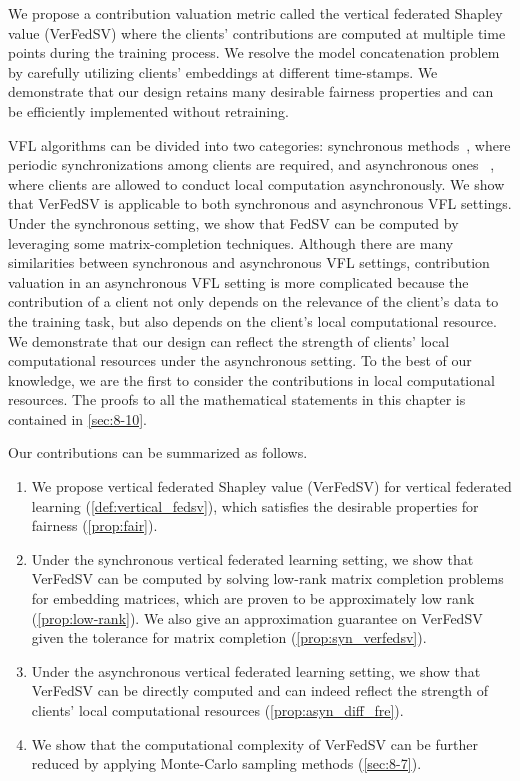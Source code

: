  We propose a contribution valuation metric called the vertical federated Shapley value (VerFedSV)
where the clients' contributions are computed at multiple time points during the training process. We resolve the model concatenation problem by carefully utilizing clients' embeddings at different time-stamps. 
We demonstrate that our design retains many desirable fairness properties and can be efficiently implemented without retraining. 

VFL algorithms can be divided into two categories: synchronous methods~\cite{Gong2016PrivateDA,Zhang2018FeatureDistributedSF,liu2019communication}, where periodic synchronizations
 among clients are required, and asynchronous ones
 ~\cite{Hu2019FDMLAC,Gu2020PrivacyPreservingAF,chen2020vafl}, where clients are allowed to conduct local computation asynchronously. We show that VerFedSV is applicable to both synchronous and asynchronous VFL settings. Under the synchronous setting, we show that FedSV can be computed by leveraging some matrix-completion techniques. Although there are many similarities between synchronous and asynchronous VFL settings, contribution valuation in an asynchronous VFL setting is more complicated because the contribution of a client not only depends on the relevance of the client's data to the training task, but also depends on the client's local computational resource. We demonstrate that our design can reflect the strength of clients' local computational resources under the asynchronous setting. To the best of our knowledge, we are the first to consider the contributions in local computational resources. The proofs to all the mathematical statements in this chapter is contained in \autoref{sec:8-10}.

Our contributions can be summarized as follows.
\begin{enumerate}
    \item We propose vertical federated Shapley value (VerFedSV) for vertical federated learning (\autoref{def:vertical_fedsv}), which satisfies the desirable properties for fairness (\autoref{prop:fair}). 
    \item Under the synchronous vertical federated learning setting, we show that VerFedSV can be computed by solving low-rank matrix completion problems for embedding matrices, which are proven to be approximately low rank (\autoref{prop:low-rank}). We also give an approximation guarantee on VerFedSV given the tolerance for matrix completion (\autoref{prop:syn_verfedsv}).
    \item Under the asynchronous vertical federated learning setting, we show that VerFedSV can be directly computed and can indeed reflect the strength of clients' local computational resources (\autoref{prop:asyn_diff_fre}).
    \item We show that the computational complexity of VerFedSV can be further reduced by applying Monte-Carlo sampling methods (\autoref{sec:8-7}). 
\end{enumerate}

